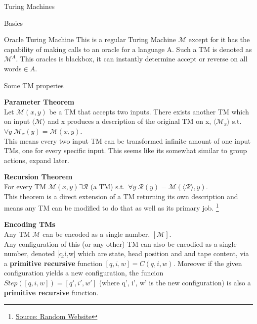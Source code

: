 \documentclass[12pt, letterpaper]{article}
\begin{document}
\begin{section}{Turing Machines}
\begin{subsection}{Basics}
\begin{subsubsection}{Oracle Turing Machine}
      This is a regular Turing Machine \(\mathscr{M}\) except for it has the
      capability of making calls to an oracle for a language A. Such a TM is
      denoted as \(\mathscr{M}^{A}\). This oracles is blackbox, it can instantly
      determine accept or reverse on all words\(\in A\).

    \end{subsubsection}

    \begin{subsubsection}{Some TM properies}

      \textbf{Parameter Theorem} \\
      Let \(\mathscr{M}(x, y)\) be a TM that accepts two inputs. There exists
      another TM which on input \(\langle \mathscr{M} \rangle\) and x produces
      a description of the original TM on x, \(\langle \mathscr{M}_{x} \rangle\)
      s.t.\ \(\forall y \; \mathscr{M}_{x}(y) = \mathscr{M}(x, y)\). \\
      This means every two input TM can be transformed infinite amount of one
      input TMs, one for every specific input. This seems like its somewhat
      similar to group actions, expand later.

      \textbf{Recursion Theorem} \\
      For every TM \(\mathscr{M}(x, y) \exists \mathscr{R}\) (a TM) s.t.\
      \(\forall y \; \mathscr{R}(y) = \mathscr{M}(\langle \mathscr{R} \rangle, y)\). \\
      This theorem is a direct extension of a TM returning its own description
      and means any TM can be modified to do that as well as its primary job.
      \footnote{
        \href{https://ianfinlayson.net/class/cpsc326/notes/16-recursion-theorem}
        {Source: Random Website}}

      \textbf{Encoding TMs} \\
      Any TM \(\mathscr{M}\) can be encoded as a single number, \([\mathscr{M}]\). \\
      Any configuration of this (or any other) TM can also be encodied as a single number,
      denoted [q,i,w] which are state, head position and and tape content, via a
      \textbf{primitive recursive} function \([q, i, w] = C(q, i, w)\).
      Moreover if the given configuration yields a new configuration, the funcion
      \(Step([q, i, w]) = [q', i', w']\) (where q', i', w' is the new configuration)
      is also a \textbf{primitive recursive} function.

    \end{subsubsection}


\end{subsection}
\end{section}
\end{document}
